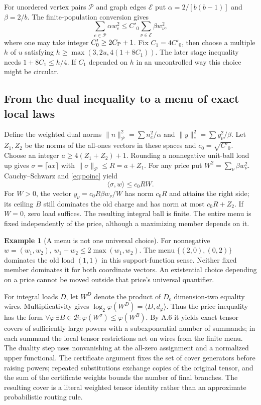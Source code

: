 \documentclass[11pt,letterpaper]{article}
\theoremstyle{definition}\newtheorem{definition}[theorem]{Definition}\newtheorem{example}[theorem]{Example}
\theoremstyle{remark}\newtheorem{remark}[theorem]{Remark}
\begin{document}
For unordered vertex pairs $\mathcal P$ and graph edges $\mathcal E$ put $\alpha=2/[b(b-1)]$ and $\beta=2/b$. The finite-population conversion gives
\begin{equation}\label{eq:poinc}
 \sum_{e\in\mathcal P}\alpha w_e^2\le C'_0\sum_{\nu\in\mathcal E}\beta w_\nu^2,
\end{equation}
where one may take integer $C'_0\ge2C_{\rm P}+1$. Fix $C_1=4C'_0$, then choose a multiple $h$ of $u$ satisfying $h\ge\max(3,2u,4(1+8C_1))$. The later stage inequality needs $1+8C_1\le h/4$. If $C_1$ depended on $h$ in an uncontrolled way this choice might be circular.

\subsection{From the dual inequality to a menu of exact local laws}\label{sec:laws}
Define the weighted dual norms $\|n\|_{\mathcal P}^2=\sum n_e^2/\alpha$ and $\|y\|_*^2=\sum y_\nu^2/\beta$. Let $Z_1,Z_2$ be the norms of the all-ones vectors in these spaces and $c_0=\sqrt{C'_0}$. Choose an integer $a\ge4(Z_1+Z_2)+1$. Rounding a nonnegative unit-ball load up gives $\sigma=\lceil ax\rceil$ with $\|\sigma\|_{\mathcal P}\le R=a+Z_1$. For any price put $W^2=\sum_{\nu}\beta w_\nu^2$. Cauchy--Schwarz and \eqref{eq:poinc} yield
\[
 \langle\sigma,w\rangle\le c_0RW.
\]
For $W>0$, the vector $y_\nu=c_0R\beta w_\nu/W$ has norm $c_0R$ and attains the right side; its ceiling $B$ still dominates the old charge and has norm at most $c_0R+Z_2$. If $W=0$, zero load suffices. The resulting integral ball is finite. The entire menu is fixed independently of the price, although a maximizing member depends on it.

\begin{example}[A menu is not one universal choice]
For nonnegative $w=(w_1,w_2)$, $w_1+w_2\le2\max(w_1,w_2)$. The menu $\{(2,0),(0,2)\}$ dominates the old load $(1,1)$ in this support-function sense. Neither fixed member dominates it for both coordinate vectors. An existential choice depending on a price cannot be moved outside that price's universal quantifier.
\end{example}
For integral loads $D$, let $W^D$ denote the product of $D_e$ dimension-two equality wires. Multiplicativity gives $\log_2\varphi(W^D)=\langle D,d_\varphi\rangle$. Thus the price inequality has the form $\forall\varphi\,\exists B\in\mathcal B:\varphi(W^\sigma)\le\varphi(W^B)$. By A.6 it yields exact tensor covers of sufficiently large powers with a subexponential number of summands; in each summand the local tensor restrictions act on wires from the finite menu. The duality step uses nonvanishing at the all-zero assignment and a normalized upper functional. The certificate argument fixes the set of cover generators before raising powers; repeated substitutions exchange copies of the original tensor, and the sum of the certificate weights bounds the number of final branches. The resulting cover is a literal weighted tensor identity rather than an approximate probabilistic routing rule.
\end{document}
